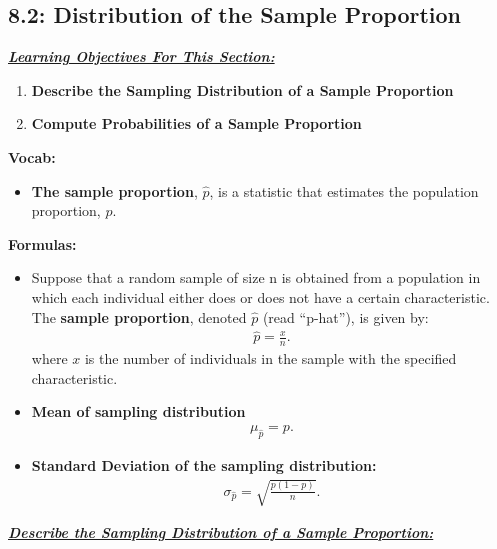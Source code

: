 \documentclass{report}
\begin{document}
     \pagebreak 
     \subsection*{8.2: Distribution of the Sample Proportion}
     \bigbreak \noindent 
     \textbf{\textit{\underline{Learning Objectives For This Section:}}}
     \begin{enumerate}
         \item \textbf{Describe the Sampling Distribution of a Sample Proportion}
         \item \textbf{Compute Probabilities of a Sample Proportion}
     \end{enumerate}
     \bigbreak \noindent 
     \textbf{Vocab:}
     \begin{itemize}
         \item \textbf{The sample proportion}, $\hat{p} $, is a statistic that estimates the population proportion, $p $.
     \end{itemize}
     \bigbreak \noindent 
     \textbf{Formulas:}
     \begin{itemize}
         \item Suppose that a random sample of size n is obtained from a population in which each individual either does or does not have a certain characteristic. The \textbf{sample proportion}, denoted $\hat{p}$ (read “p-hat”), is given by:
             \begin{align*}
                 \hat{p} = \frac{x}{n}
             .\end{align*}
            where $x $ is the number of individuals in the sample with the specified characteristic. 
        \item \textbf{Mean of sampling distribution}
            \begin{align*}
                \mu_{\hat{p}} = p
            .\end{align*}
        \item \textbf{Standard Deviation of the sampling distribution:}
            \begin{align*}
               \sigma_{\hat{p}} = \sqrt{\frac{p(1-p)}{n}} 
            .\end{align*}     
     \end{itemize}
     \pagebreak \bigbreak \noindent 
     \textbf{\textit{\underline{Describe the Sampling Distribution of a Sample Proportion:}}}
     \bigbreak \noindent 
     \bigbreak \noindent 
\end{document}
